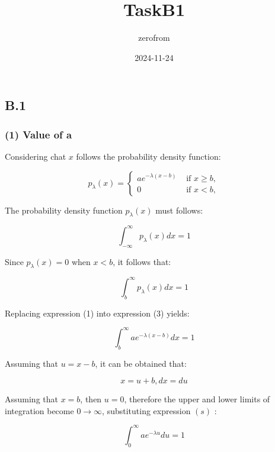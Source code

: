\documentclass[
]{article}
\title{TaskB1}
\author{zerofrom}
\date{2024-11-24}
\begin{document}
\maketitle

\subsection{B.1}\label{b.1}

\subsubsection{(1) Value of a}\label{value-of-a}

Considering chat \(x\) follows the probability density function:

\[
p_{\lambda}(x)= \begin{cases}a e^{-\lambda(x-b)} & \text { if } x \geqslant b,  \tag{1}\\ 0 & \text { if } x<b,\end{cases}
\]

The probability density function \(p_{\lambda}(x)\) must follows:

\[
\begin{equation*}
\int_{-\infty}^{\infty} p_{\lambda}(x) d x=1 \tag{2}
\end{equation*}
\]

Since \(p_{\lambda}(x)=0\) when \(x<b\), it follows that:

\[
\begin{equation*}
\int_{b}^{\infty} p_{\lambda}(x) d x=1 \tag{3}
\end{equation*}
\]

Replacing expression (1) into expression (3) yields:

\[
\begin{equation*}
\int_{b}^{\infty} a e^{-\lambda(x-b)} d x=1 \tag{4}
\end{equation*}
\]

Assuming that \(u=x-b\), it can be obtained that:

\[
\begin{equation*}
x=u+b, d x=d u \tag{5}
\end{equation*}
\]

Assuming that \(x=b\), then \(u=0\), therefore the upper and lower
limits of integration become \(0 \rightarrow \infty\), substituting
expression \((s)\) :

\[
\begin{equation*}
\int_{0}^{\infty} a e^{-\lambda u} d u=1 \tag{6}
\end{equation*}
\]
\end{document}
